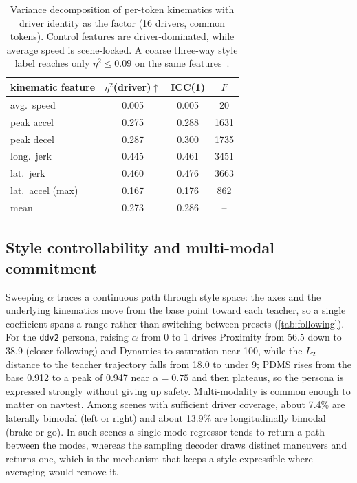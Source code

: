 \begin{table}[t]
    \centering
    \small
    \setlength{\tabcolsep}{6pt}
    \begin{tabular}{lccc}
        \toprule
        kinematic feature & $\eta^2$(driver)$\uparrow$ & ICC(1) & $F$ \\
        \midrule
        avg.\ speed        & 0.005 & 0.005 & 20 \\
        peak accel         & 0.275 & 0.288 & 1631 \\
        peak decel         & 0.287 & 0.300 & 1735 \\
        long.\ jerk        & 0.445 & 0.461 & 3451 \\
        lat.\ jerk         & 0.460 & 0.476 & 3663 \\
        lat.\ accel (max)  & 0.167 & 0.176 & 862 \\
        \midrule
        mean               & 0.273 & 0.286 & -- \\
        \bottomrule
    \end{tabular}
    \caption{Variance decomposition of per-token kinematics with driver identity as
    the factor (16 drivers, common tokens). Control features are driver-dominated,
    while average speed is scene-locked. A coarse three-way style label reaches only
    $\eta^2 \le 0.09$ on the same features~\cite{styledrive}.}
    \label{tab:vardecomp}
\end{table}

\subsection{Style controllability and multi-modal commitment}
\label{sec:exp:style}
Sweeping $\alpha$ traces a continuous path through style space: the axes and the
underlying kinematics move from the base point toward each teacher, so a single
coefficient spans a range rather than switching between presets
(\cref{tab:following}). For the \texttt{ddv2} persona, raising $\alpha$ from 0 to 1
drives Proximity from 56.5 down to 38.9 (closer following) and Dynamics to saturation
near 100, while the $L_2$ distance to the teacher trajectory falls from 18.0 to under
9; PDMS rises from the base 0.912 to a peak of 0.947 near $\alpha{=}0.75$ and then
plateaus, so the persona is expressed strongly without giving up safety. Multi-modality
is common enough to matter on navtest. Among
scenes with sufficient driver coverage, about 7.4\% are laterally bimodal (left or
right) and about 13.9\% are longitudinally bimodal (brake or go). In such scenes a
single-mode regressor tends to return a path between the modes, whereas the sampling
decoder draws distinct maneuvers and returns one, which is the mechanism that keeps a
style expressible where averaging would remove it.

